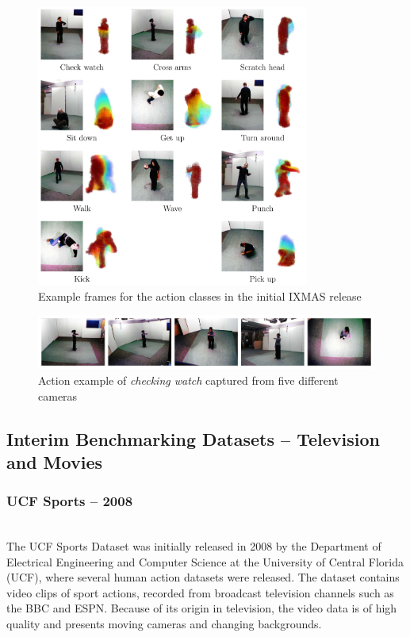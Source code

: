 \begin{figure}[H]
    \centering
    \includegraphics[width=0.8\textwidth]{img_datasets/ixmas_example}
    \caption{Example frames for the action classes in the initial IXMAS release \cite{weinland_free_2006}}
    \label{fig:ixmas_example}
\end{figure}

\begin{figure}[H]
    \centering
    \includegraphics[width=\textwidth]{img_datasets/ixmas_fiveviews}
    \caption{Action example of \textit{checking watch} captured from five different cameras \cite{weinland_free_2006}}
    \label{fig:ixmas_fiveviews}
\end{figure}


\subsection{Interim Benchmarking Datasets -- Television and Movies}


\subsubsection{UCF Sports -- 2008}
\cite{rodriguez_action_2008}\cite{soomro_action_2014}\\
The UCF Sports Dataset was initially released in 2008 by the Department of Electrical Engineering and Computer Science at the University of Central Florida (UCF), where several human action datasets were released.
The dataset contains video clips of sport actions, recorded from broadcast television channels such as the BBC and ESPN.
Because of its origin in television, the video data is of high quality and presents moving cameras and changing backgrounds.

